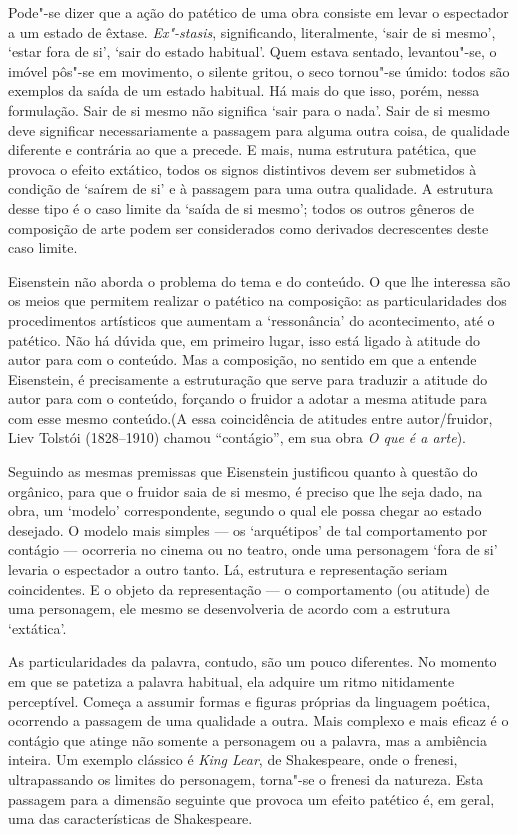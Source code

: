 Pode"-se dizer que a ação do patético de uma obra consiste em levar o
espectador a um estado de êxtase. \emph{Ex"-stasis}, significando,
literalmente, `sair de si mesmo', `estar fora de si', `sair do estado
habitual'. Quem estava sentado, levantou"-se, o imóvel pôs"-se em
movimento, o silente gritou, o seco tornou"-se úmido: todos são exemplos
da saída de um estado habitual. Há mais do que isso, porém, nessa
formulação. Sair de si mesmo não significa `sair para o nada'. Sair de
si mesmo deve significar necessariamente a passagem para alguma outra
coisa, de qualidade diferente e contrária ao que a precede. E mais, numa
estrutura patética, que provoca o efeito extático, todos os signos
distintivos devem ser submetidos à condição de `saírem de si' e à
passagem para uma outra qualidade. A estrutura desse tipo é o caso
limite da `saída de si mesmo'; todos os outros gêneros de composição de
arte podem ser considerados como derivados decrescentes deste caso
limite.

Eisenstein não aborda o problema do tema e do conteúdo. O que lhe
interessa são os meios que permitem realizar o patético na composição:
as particularidades dos procedimentos artísticos que aumentam a
`ressonância' do acontecimento, até o patético. Não há dúvida que, em
primeiro lugar, isso está ligado à atitude do autor para com o conteúdo.
Mas a composição, no sentido em que a entende Eisenstein, é precisamente
a estruturação que serve para traduzir a atitude do autor para com o
conteúdo, forçando o fruidor a adotar a mesma atitude para com esse
mesmo conteúdo.(A essa coincidência de atitudes entre autor/fruidor,
Liev Tolstói (1828--1910) chamou ``contágio'', em sua obra \emph{O que é
a arte}).

Seguindo as mesmas premissas que Eisenstein justificou quanto à questão
do orgânico, para que o fruidor saia de si mesmo, é preciso que lhe seja
dado, na obra, um `modelo' correspondente, segundo o qual
ele possa chegar ao estado desejado. O modelo mais simples --- os
`arquétipos' de tal comportamento por contágio --- ocorreria no cinema
ou no teatro, onde uma personagem `fora de si' levaria o espectador a
outro tanto. Lá, estrutura e representação seriam coincidentes. E o
objeto da representação --- o comportamento (ou atitude) de uma
personagem, ele mesmo se desenvolveria de acordo com a estrutura
`extática'.

As particularidades da palavra, contudo, são um pouco diferentes. No
momento em que se patetiza a palavra habitual, ela adquire um ritmo
nitidamente perceptível. Começa a assumir formas e figuras próprias da
linguagem poética, ocorrendo a passagem de uma qualidade a outra. Mais
complexo e mais eficaz é o contágio que atinge não somente a personagem
ou a palavra, mas a ambiência inteira. Um exemplo clássico é \emph{King
Lear}, de Shakespeare, onde o frenesi, ultrapassando os limites do
personagem, torna"-se o frenesi da natureza. Esta passagem para a
dimensão seguinte que provoca um efeito patético é, em geral, uma das
características de Shakespeare.

